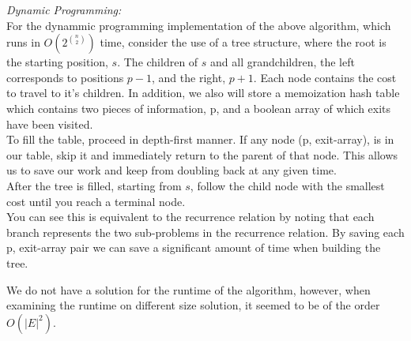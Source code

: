 \documentclass{article}
\begin{document}
\begin{enumerate}
\emph{Dynamic Programming:}\\

For the dynammic programming implementation of the above algorithm, which runs in $O(2^{n \choose 2})$  time, consider the use of a tree structure, where the root is the starting position, $s$. The children of $s$ and all grandchildren, the left corresponds to positions $p-1$, and the right, $p+1$. Each node contains the cost to travel to it's children. In addition, we also will store a memoization hash table which contains two pieces of information, p, and a boolean array of which exits have been visited.\\
To fill the table, proceed in depth-first manner. If any node (p, exit-array), is in our table, skip it and immediately return to the parent of that node. This allows us to save our work and keep from doubling back at any given time.\\
After the tree is filled, starting from $s$, follow the child node with the smallest cost until you reach a terminal node.\\

You can see this is equivalent to the recurrence relation by noting that each branch represents the two sub-problems in the recurrence relation. By saving each p, exit-array pair we can save a significant amount of time when building the tree.

We do not have a solution for the runtime of the algorithm, however, when examining the runtime on different size solution, it seemed to be of the order $O(|E|^2)$. 

\end{enumerate}
\end{document}
